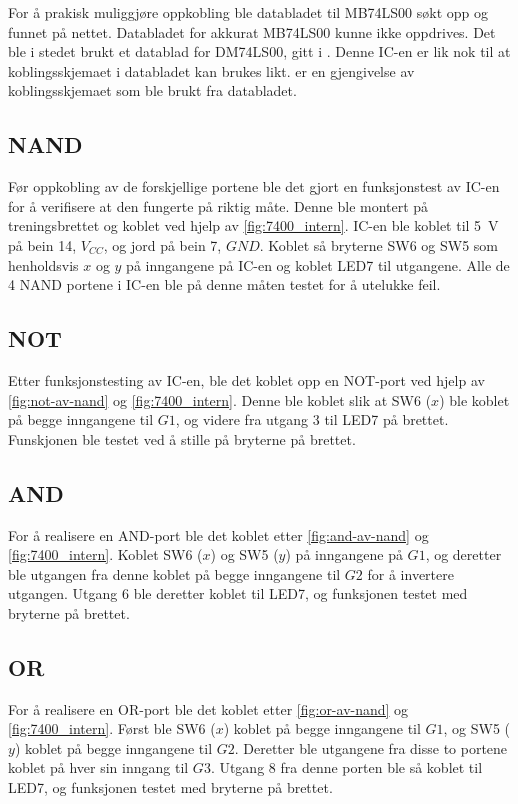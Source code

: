 \documentclass[11pt,a4paper,twocolumn]{article}
\begin{document}
For å prakisk muliggjøre oppkobling ble databladet til MB74LS00 søkt opp og funnet på nettet. Databladet for akkurat MB74LS00 kunne ikke oppdrives. Det ble i stedet brukt et datablad for DM74LS00, gitt i \cite{datablad}. Denne IC-en er lik nok til at koblingsskjemaet i databladet kan brukes likt.  er en gjengivelse av koblingsskjemaet som ble brukt fra databladet.

\subsection{NAND}
Før oppkobling av de forskjellige portene ble det gjort en funksjonstest av IC-en for å verifisere at den fungerte på riktig måte. Denne ble montert på treningsbrettet og koblet ved hjelp av \cref{fig:7400_intern}. IC-en ble koblet til \qty{5}{\volt} på bein 14, $V_{CC}$, og jord på bein 7, $GND$. Koblet så bryterne SW6 og SW5 som henholdsvis $x$ og $y$ på inngangene på IC-en og koblet LED7 til utgangene. Alle de 4 NAND portene i IC-en ble på denne måten testet for å utelukke feil.

\subsection{NOT}
Etter funksjonstesting av IC-en, ble det koblet opp en NOT-port ved hjelp av \cref{fig:not-av-nand} og \cref{fig:7400_intern}. Denne ble koblet slik at SW6 ($x$) ble koblet på begge inngangene til $G1$, og videre fra utgang $3$ til LED7 på brettet. Funskjonen ble testet ved å stille på bryterne på brettet.

\subsection{AND}
For å realisere en AND-port ble det koblet etter \cref{fig:and-av-nand} og \cref{fig:7400_intern}. Koblet SW6 ($x$) og SW5 ($y$) på inngangene på $G1$, og deretter ble utgangen fra denne koblet på begge inngangene til $G2$ for å invertere utgangen. Utgang $6$ ble deretter koblet til LED7, og funksjonen testet med bryterne på brettet.

\subsection{OR}
For å realisere en OR-port ble det koblet etter \cref{fig:or-av-nand} og \cref{fig:7400_intern}. Først ble SW6 ($x$) koblet på begge inngangene til $G1$, og SW5 ($y$) koblet på begge inngangene til $G2$. Deretter ble utgangene fra disse to portene koblet på hver sin inngang til $G3$. Utgang $8$ fra denne porten ble så koblet til LED7, og funksjonen testet med bryterne på brettet.
\end{document}
